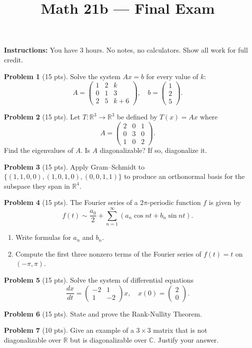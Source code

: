\documentclass{amsart}
\title{Math 21b --- Final Exam}
\date{}
\begin{document}
\maketitle
\textbf{Instructions:} You have 3 hours. No notes, no calculators. Show all work for full credit.

\bigskip

\textbf{Problem 1} (15 pts). Solve the system $Ax = b$ for every value of $k$:
\[
A = \begin{pmatrix}1&2&k\\0&1&3\\2&5&k+6\end{pmatrix}, \quad b = \begin{pmatrix}1\\2\\5\end{pmatrix}.
\]

\bigskip

\textbf{Problem 2} (15 pts). Let $T: \mathbb{R}^3 \to \mathbb{R}^3$ be defined by $T(x) = Ax$ where
\[
A = \begin{pmatrix}2&0&1\\0&3&0\\1&0&2\end{pmatrix}.
\]
Find the eigenvalues of $A$. Is $A$ diagonalizable? If so, diagonalize it.

\bigskip

\textbf{Problem 3} (15 pts). Apply Gram--Schmidt to $\{(1,1,0,0),(1,0,1,0),(0,0,1,1)\}$ to produce an orthonormal basis for the subspace they span in $\mathbb{R}^4$.

\bigskip

\textbf{Problem 4} (15 pts). The Fourier series of a $2\pi$-periodic function $f$ is given by
\[
f(t) \sim \frac{a_0}{2} + \sum_{n=1}^{\infty}(a_n \cos nt + b_n \sin nt).
\]
\begin{enumerate}
    \item[(a)] Write formulas for $a_n$ and $b_n$.
    \item[(b)] Compute the first three nonzero terms of the Fourier series of $f(t) = t$ on $(-\pi, \pi)$.
\end{enumerate}

\bigskip

\textbf{Problem 5} (15 pts). Solve the system of differential equations
\[
\frac{dx}{dt} = \begin{pmatrix}-2&1\\1&-2\end{pmatrix}x, \quad x(0) = \begin{pmatrix}2\\0\end{pmatrix}.
\]

\bigskip

\textbf{Problem 6} (15 pts). State and prove the Rank-Nullity Theorem.

\bigskip

\textbf{Problem 7} (10 pts). Give an example of a $3\times 3$ matrix that is not diagonalizable over $\mathbb{R}$ but is diagonalizable over $\mathbb{C}$. Justify your answer.
\end{document}
